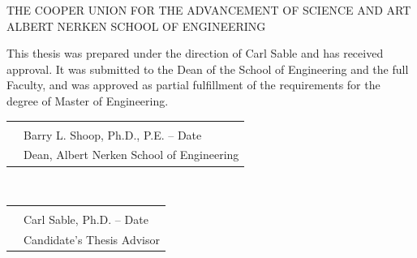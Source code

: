 \centering
\vspace*{1in}
{THE COOPER UNION FOR THE ADVANCEMENT OF SCIENCE AND ART}\\[2em]
{ALBERT NERKEN SCHOOL OF ENGINEERING}\\[10em]

\raggedright
This thesis was prepared under the direction of Carl Sable and has received
approval. It was submitted to the Dean of the School of Engineering and the
full Faculty, and was approved as partial fulfillment of the requirements
for the degree of Master of Engineering.\\[6em]

\raggedleft
\begin{tabular}{@{}p{.5in}p{4in}@{}}
& \hrulefill \\
& Barry L. Shoop, Ph.D., P.E. -- Date \\
& Dean, Albert Nerken School of Engineering\\
\end{tabular}\\[8em]

\raggedright
\begin{tabular}{@{}p{0in}p{4in}@{}}
& \hrulefill \\
& Carl Sable, Ph.D. -- Date \\
& Candidate's Thesis Advisor\\
\end{tabular}

